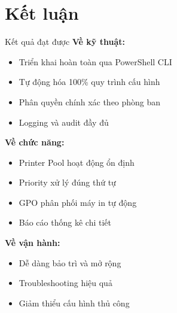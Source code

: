 \documentclass{beamer}
\begin{document}
    \section{Kết luận}
    \begin{frame}{Kết quả đạt được}
        \textbf{Về kỹ thuật:}
        \begin{itemize}
            \item Triển khai hoàn toàn qua PowerShell CLI
            \item Tự động hóa 100\% quy trình cấu hình
            \item Phân quyền chính xác theo phòng ban
            \item Logging và audit đầy đủ
        \end{itemize}
        
        \vspace{0.3cm}
        \textbf{Về chức năng:}
        \begin{itemize}
            \item Printer Pool hoạt động ổn định
            \item Priority xử lý đúng thứ tự
            \item GPO phân phối máy in tự động
            \item Báo cáo thống kê chi tiết
        \end{itemize}
        
        \vspace{0.3cm}
        \textbf{Về vận hành:}
        \begin{itemize}
            \item Dễ dàng bảo trì và mở rộng
            \item Troubleshooting hiệu quả
            \item Giảm thiểu cấu hình thủ công
        \end{itemize}
    \end{frame}
\end{document}
